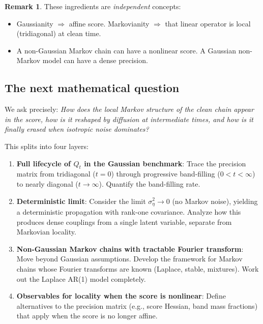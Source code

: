 \documentclass[11pt,a4paper]{article}
\theoremstyle{plain}
\theoremstyle{definition}
\newtheorem{remark}[theorem]{Remark}
\newcommand{\Prec}{Q}
\begin{document}
\begin{remark}
These ingredients are \emph{independent} concepts:
\begin{itemize}
\item Gaussianity $\Rightarrow$ affine score. Markovianity $\Rightarrow$ that linear operator is local (tridiagonal) at clean time.
\item A non-Gaussian Markov chain can have a nonlinear score. A Gaussian non-Markov model can have a dense precision.
\end{itemize}
\end{remark}

\subsection{The next mathematical question}
\label{sec:next-question}

We ask precisely: \textit{How does the local Markov structure of the clean chain appear in the score, how is it reshaped by diffusion at intermediate times, and how is it finally erased when isotropic noise dominates?}

This splits into four layers:

\begin{enumerate}
\item \textbf{Full lifecycle of $\Prec_t$ in the Gaussian benchmark}: Trace the precision matrix from tridiagonal ($t=0$) through progressive band-filling ($0 < t < \infty$) to nearly diagonal ($t \to \infty$). Quantify the band-filling rate.

\item \textbf{Deterministic limit}: Consider the limit $\sigma_\eta^2 \to 0$ (no Markov noise), yielding a deterministic propagation with rank-one covariance. Analyze how this produces dense couplings from a single latent variable, separate from Markovian locality.

\item \textbf{Non-Gaussian Markov chains with tractable Fourier transform}: Move beyond Gaussian assumptions. Develop the framework for Markov chains whose Fourier transforms are known (Laplace, stable, mixtures). Work out the Laplace AR(1) model completely.

\item \textbf{Observables for locality when the score is nonlinear}: Define alternatives to the precision matrix (e.g., score Hessian, band mass fractions) that apply when the score is no longer affine.
\end{enumerate}
\end{document}
